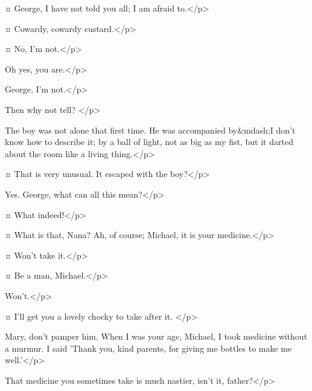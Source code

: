 
\mrsdarlingspeaks {}¤
George, I have not told you all; I am afraid to.</p>

\mrdarlingspeaks {}¤
Cowardy, cowardy custard.</p>

\mrsdarlingspeaks {}¤
No, I'm not.</p>

\mrdarlingspeaks
Oh yes, you are.</p>

\mrsdarlingspeaks
George, I'm not.</p>

\mrdarlingspeaks
Then why not tell?
</p>

\mrsdarlingspeaks
The boy was not alone that first time.
He was accompanied by&mdash;I don't know how to describe it; by a ball of light, not as big as my fist, but it darted about the room like a living thing.</p>

\mrdarlingspeaks {}¤
That is very unusual.
It escaped with the boy?</p>

\mrsdarlingspeaks
Yes.
George, what can all this mean?</p>

\mrdarlingspeaks {}¤
What indeed!</p>


\mrsdarlingspeaks {}¤
What is that, Nana?
Ah, of course; Michael, it is your medicine.</p>

\michaelspeaks {}¤
Won't take it.</p>

\mrdarlingspeaks {}¤
Be a man, Michael.</p>

\michaelspeaks
Won't.</p>

\mrsdarlingspeaks {}¤
I'll get you a lovely chocky to take after it.
</p>

\mrdarlingspeaks
Mary, don't pamper him.
When I was your age, Michael, I took medicine without a murmur.
I said 'Thank you, kind parents, for giving me bottles to make me well.'</p>


\wendyspeaks
That medicine you sometimes take is much nastier, isn't it, father?</p>

